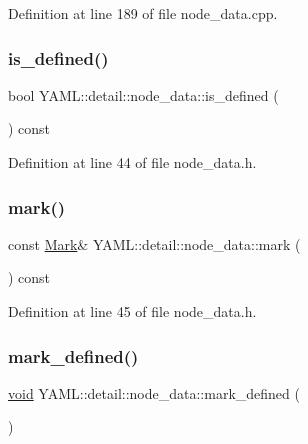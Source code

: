 Definition at line 189 of file node\+\_\+data.\+cpp.

\mbox{\label{class_y_a_m_l_1_1detail_1_1node__data_a1c4c2c8c9555d11dc043c3c9c4706caa}} 
\subsubsection{\texorpdfstring{is\_defined()}{is\_defined()}}
{\footnotesize\ttfamily bool Y\+A\+M\+L\+::detail\+::node\+\_\+data\+::is\+\_\+defined (\begin{DoxyParamCaption}{ }\end{DoxyParamCaption}) const\hspace{0.3cm}{\ttfamily [inline]}}



Definition at line 44 of file node\+\_\+data.\+h.

\mbox{\label{class_y_a_m_l_1_1detail_1_1node__data_a346a2ad0e695d513614814d9a67c8536}} 
\subsubsection{\texorpdfstring{mark()}{mark()}}
{\footnotesize\ttfamily const \mbox{\hyperlink{struct_y_a_m_l_1_1_mark}{Mark}}\& Y\+A\+M\+L\+::detail\+::node\+\_\+data\+::mark (\begin{DoxyParamCaption}{ }\end{DoxyParamCaption}) const\hspace{0.3cm}{\ttfamily [inline]}}



Definition at line 45 of file node\+\_\+data.\+h.

\mbox{\label{class_y_a_m_l_1_1detail_1_1node__data_ad221be844f0c11bac6c5c3896db05181}} 
\subsubsection{\texorpdfstring{mark\_defined()}{mark\_defined()}}
{\footnotesize\ttfamily \mbox{\hyperlink{glad_8h_a950fc91edb4504f62f1c577bf4727c29}{void}} Y\+A\+M\+L\+::detail\+::node\+\_\+data\+::mark\+\_\+defined (\begin{DoxyParamCaption}{ }\end{DoxyParamCaption})}



